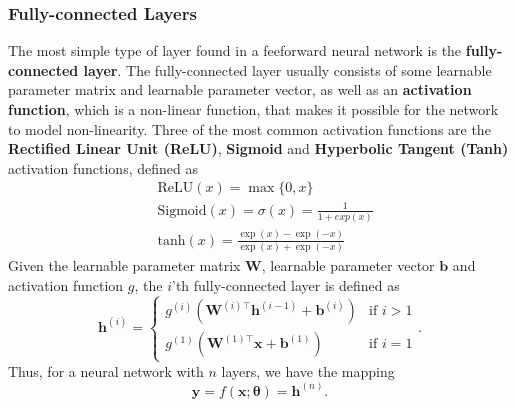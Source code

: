 \documentclass[./main.tex]{subfiles}
\begin{document}
\subsubsection{Fully-connected Layers}
The most simple type of layer found in a feeforward neural network is the \textbf{fully-connected layer}. The fully-connected layer usually consists of some learnable parameter matrix and learnable parameter vector, as well as an \textbf{activation function}, which is a non-linear function, that makes it possible for the network to model non-linearity. Three of the most common activation functions are the \textbf{Rectified Linear Unit (ReLU)}, \textbf{Sigmoid} and \textbf{Hyperbolic Tangent (Tanh)} activation functions, defined as
\begin{align}
    &\text{ReLU}(x) = \max\{0, x\} \\ 
    &\text{Sigmoid}(x) = \sigma(x) = \frac{1}{1 + exp(x)} \\ 
    &\text{tanh}(x) = \frac{\exp(x) - \exp(-x)}{\exp(x) + \exp(-x)}
\end{align}
Given the learnable parameter matrix $\bm{W}$, learnable parameter vector $\bm{b}$ and activation function $g$, the $i$'th fully-connected layer is defined as
\begin{equation}
    \bm{h}^{(i)} =
    \begin{cases}
        g^{(i)} \left( \bm{W}^{(i) \top} \bm{h}^{(i - 1)} + \bm{b}^{(i)} \right) & \text{if } i > 1 \\
        g^{(1)} \left( \bm{W}^{(1) \top} \bm{x} + \bm{b}^{(1)} \right) & \text{if } i = 1
    \end{cases}
    .
\end{equation}
Thus, for a neural network with $n$ layers, we have the mapping \cite{DL_book}
\begin{equation}
    \bm{y} = f(\bm{x};\bm{\theta}) = \bm{h}^{(n)}.
\end{equation}
\end{document}
